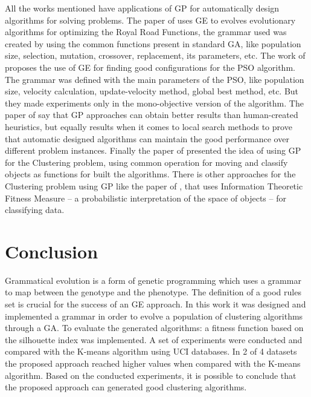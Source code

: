 \documentclass[journal]{IEEEtran}
\begin{document}
	All the works mentioned have applications of GP for automatically design algorithms for solving problems. The paper of \cite{lourencco2012evolving} uses GE to evolves evolutionary algorithms for optimizing the Royal Road Functions, the grammar used was created by using the common functions present in standard GA, like population size, selection, mutation, crossover, replacement, its parameters, etc. The work of \cite{miranda2015gefpso} proposes the use of GE for finding good configurations for the PSO algorithm. The grammar was defined with the main parameters of the PSO, like population size, velocity calculation, update-velocity method, global best method, etc. But they made experiments only in the mono-objective version of the algorithm. The paper of \cite{burke2012grammatical} say that GP approaches can obtain better results than human-created heuristics, but equally results when it comes to local search methods to prove that automatic designed algorithms can maintain the good performance over different problem instances. Finally the paper of \cite{bolton2015optimizing} presented the idea of using GP for the Clustering problem, using common operation for moving and classify objects as functions for built the algorithms. There is other approaches for the Clustering problem using GP like the paper of \cite{boric2007genetic}, that uses Information Theoretic Fitness Measure -- a probabilistic interpretation of the space of objects -- for classifying data.
	
		
	\section{Conclusion}
	\label{sec:conclusion}
	
	Grammatical evolution is a form of genetic programming which uses a grammar to map between the genotype and the phenotype. The definition of a good rules set is crucial for the success of an GE approach. In this work it was designed and implemented a grammar in order to evolve a population of clustering algorithms through a GA. To evaluate the generated algorithms: a fitness function based on the silhouette index was implemented.
	A set of experiments were conducted and compared with the K-means algorithm using UCI databases. In 2 of 4 datasets the proposed approach reached higher values when compared with the K-means algorithm.
	Based on the conducted experiments, it is possible to conclude that the proposed approach can generated good clustering algorithms.
	
	
	
	
\end{document}
